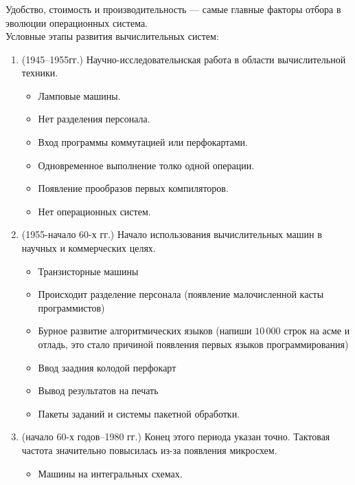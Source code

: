 \documentclass[12pt, a4paper]{article}
\begin{document}
    \subsubsection{}
    Удобство, стоимость и производительность --- самые главные факторы отбора в 
    эволюции операционных система.\\
    Условные этапы развития вычислительных систем:
    \begin{enumerate}
        \item[\text{1-й период.}] (1945--1955гг.) Научно-исследовательнская работа в области вычислительной техники.
        \begin{itemize}
            \item Ламповые машины.
            \item Нет разделения персонала.
            \item Вход программы коммутацией или перфокартами.
            \item Одновременное выполнение толко одной операции.
            \item Появление прообразов первых компиляторов.
            \item Нет операционных систем.
        \end{itemize}
        \item[\text{2-й период.}] (1955-начало 60-х гг.) Начало использования вычислительных машин в научных и коммерческих целях.
        \begin{itemize}
            \item Транзисторные машины
            \item Происходит разделение персонала (появление малочисленной касты программистов)
            \item Бурное развитие алгоритмических языков (напиши $10\,000$ строк на асме и отладь, это стало причиной появления первых языков программирования)
            \item Ввод заадния колодой перфокарт
            \item Вывод результатов на печать
            \item Пакеты заданий и системы пакетной обработки.
        \end{itemize}
        \item[\text{3-й период.}] (начало 60-х годов--1980 гг.)
        Конец этого периода указан точно. Тактовая частота значительно повысилась из-за появления микросхем.
        \begin{itemize}
            \item Машины на интегральных схемах.

\end{itemize}
\end{enumerate}
\end{document}

